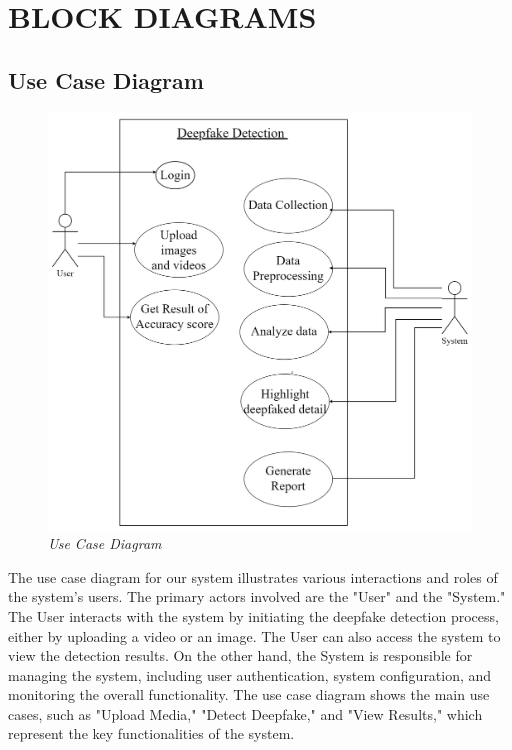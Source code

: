 
\section{BLOCK DIAGRAMS}
\subsection{Use Case Diagram}
\begin{figure}[h]
    \centering
    \includegraphics[width= 5in ]{img/usecasediagram.drawio.png}
    \caption{\textit{Use Case Diagram}}
\end{figure}
\justify
The use case diagram for our system illustrates various interactions and roles of the system's users. The primary actors involved are the "User" and the "System." The User interacts with the system by initiating the deepfake detection process, either by uploading a video or an image. The User can also access the system to view the detection results. On the other hand, the System is responsible for managing the system, including user authentication, system configuration, and monitoring the overall functionality. The use case diagram shows the main use cases, such as "Upload Media," "Detect Deepfake," and "View Results," which represent the key functionalities of the system.
